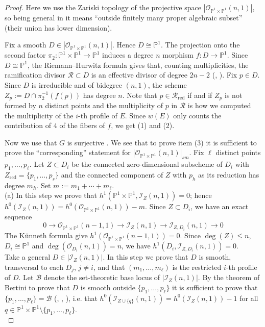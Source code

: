 \documentclass[
  a4paper, 
  reqno, 
  oneside, 
  11pt
]{amsart}
\theoremstyle{plain}	%
\theoremstyle{mydef} %
\theoremstyle{remark}
\theoremstyle{definition}
\theoremstyle{remark}
\DeclareMathOperator{\red}{red}
\begin{document}
\begin{proof}
Here we use the Zariski topology of the projective space $|\mathcal O_{\mathbb P^1\times \mathbb P^1}(n,1)|$, so being general in it means ``outside finitely many proper algebraic subset'' (their union has lower dimension).

Fix a smooth $D\in |\mathcal O_{\mathbb P^1\times \mathbb P^1}(n,1)|$. Hence $D\cong \mathbb P^1$. The projection onto the second factor  $\pi_2\colon \mathbb P^1\times \mathbb P^1\to \mathbb P^1$ induces a degree $n$ morphism $f\colon  D\to \mathbb P^1$. Since $D\cong \mathbb P^1$, the Riemann--Hurwitz formula gives that, counting multiplicities, the ramification divisor $\mathcal R\subset D$ is an effective divisor of degree $2n-2$ 
(\cite[pp.--219]{GH}, \cite[Cor.\thinspace  IV.2.4]{h}). Fix $p\in D$. Since $D$ is irreducible and of bidegree $(n,1)$, the scheme $Z_p:= D\cap \pi_2^{-1}(f(p))$ has degree $n$.
Note that $p\in \mathcal R_{\red}$ if and if $Z_p$ is not formed by $n$ distinct points and the multiplicity of $p$ in $\mathcal R$ is how we computed the multiplicity of the $i$-th profile of $E$. Since $w(E)$ only counts the contribution of $4$ of the fibers of $f$, we get (1) and (2).

Now we use that $G$ is surjective \cite[Th. 5.2.2]{BH}. We see that to prove item (3)  it is sufficient to prove the ``corresponding'' statement for $|\mathcal O_{\mathbb P^1\times \mathbb P^1}(n,1)|_{sm}$. Fix $\ell$ distinct points $p_1,\dots ,p_\ell$. Let $Z\subset D_i$ be the connected zero-dimensional subscheme of $D_i$ with $Z_{\red} =\{p_1,\dots ,p_s\}$ and the connected component of $Z$ with $p_h$ as its reduction has degree $m_h$.
Set $m:= m_1+\cdots +m_\ell$. \\

{ (a)} In this step we prove that $h^1(\mathbb P^1\times \mathbb P^1,\mathcal I_Z(n,1)) =0$; hence $h^0(\mathcal I_Z(n,1)) =h^0(\mathcal O_{\mathbb P^1\times \mathbb P^1}(n,1)) -m$.
Since $Z\subset D_i$, we have an exact sequence
\begin{equation}
0\to \mathcal O_{\mathbb P^1\times \mathbb P^1}(n-1,1)\to \mathcal I_Z(n,1)\to \mathcal I_{Z,D_i}(n,1)\to 0
\end{equation}
The K\"{u}nneth formula give $h^1(\mathcal O_{\mathbb P^1\times \mathbb P^1}(n-1,1))=0$. Since $\deg(Z)\le n$, $D_i\cong \mathbb P^1$ and $\deg(\mathcal O_{D_i}(n,1)) =n$, we have $h^1(D_i,\mathcal I_{Z,D_i}(n,1)) =0$.  \\

 Take a general $D\in |\mathcal I_Z(n,1)|$. In this step we prove that $D$ is smooth,  transversal to each $D_j$, $j\ne i$, and that $(m_1,\dots ,m_\ell)$ is the restricted $i$-th profile of $D$. Let $\mathcal B$ denote the set-theoretic base locus of $|\mathcal I_Z(n,1)|$. By the theorem of Bertini to prove that $D$ is smooth outside $\{p_1,\dots ,p_\ell\}$ it is sufficient to prove that
$\{p_1,\dots ,p_\ell\}=\mathcal B$ (\cite[p. 137]{GH}, \cite[III.10.9]{h}, \cite[6.3]{jou}), i.e. that $h^0(\mathcal I_{Z\cup \{q\}}(n,1)) =h^0(\mathcal I_Z(n,1)) -1$ for all $q\in \mathbb P^1\times \mathbb P^1\setminus \{p_1,\dots ,p_\ell\}$.\\


\end{proof}
\end{document}
